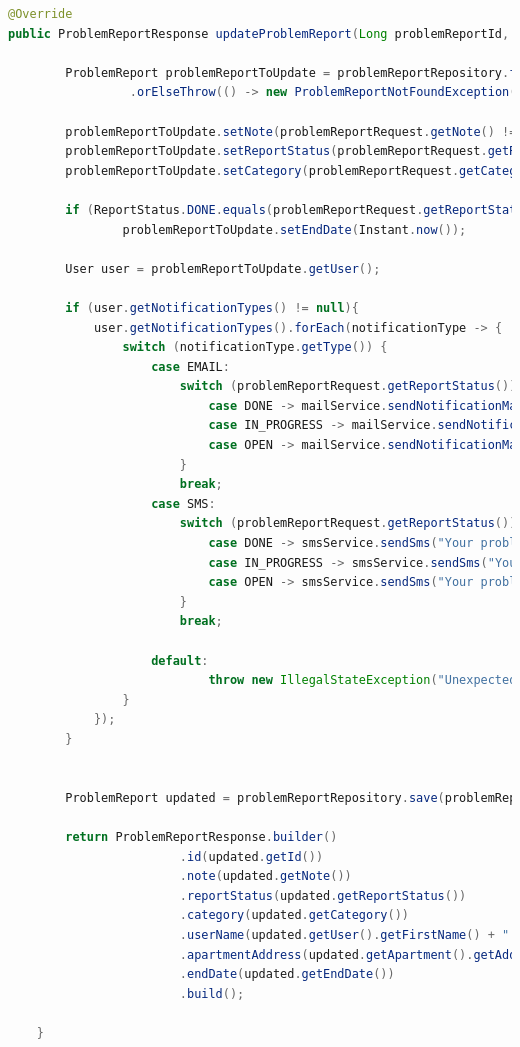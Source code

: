\begin{lstlisting}[language=Java, style=JavaStyle, caption=Aktualizacja zgłoszenia problemu.]
@Override
public ProblemReportResponse updateProblemReport(Long problemReportId, ProblemReportRequest problemReportRequest) throws ProblemReportNotFoundException {

		ProblemReport problemReportToUpdate = problemReportRepository.findById(problemReportId)
				 .orElseThrow(() -> new ProblemReportNotFoundException("Problem report not found with id: " + problemReportId));

		problemReportToUpdate.setNote(problemReportRequest.getNote() != null ? problemReportRequest.getNote() : problemReportToUpdate.getNote());
		problemReportToUpdate.setReportStatus(problemReportRequest.getReportStatus() != null ? problemReportRequest.getReportStatus() : problemReportToUpdate.getReportStatus());
		problemReportToUpdate.setCategory(problemReportRequest.getCategory() != null ? problemReportRequest.getCategory() : problemReportToUpdate.getCategory());

		if (ReportStatus.DONE.equals(problemReportRequest.getReportStatus()))
				problemReportToUpdate.setEndDate(Instant.now());

		User user = problemReportToUpdate.getUser();

		if (user.getNotificationTypes() != null){
			user.getNotificationTypes().forEach(notificationType -> {
				switch (notificationType.getType()) {
					case EMAIL:
						switch (problemReportRequest.getReportStatus()) {
							case DONE -> mailService.sendNotificationMail("Problem report done", "Your problem report has been done", user.getEmail());
							case IN_PROGRESS -> mailService.sendNotificationMail("Problem report in progress", "Your problem report is in progress", user.getEmail());
							case OPEN -> mailService.sendNotificationMail("Problem report open", "Your problem report is open", user.getEmail());
						}
						break;
					case SMS:
						switch (problemReportRequest.getReportStatus()) {
							case DONE -> smsService.sendSms("Your problem report has been done", user.getPhoneNumber());
							case IN_PROGRESS -> smsService.sendSms("Your problem report is in progress", user.getPhoneNumber());
							case OPEN -> smsService.sendSms("Your problem report is open", user.getPhoneNumber());
						}
						break;

					default:
							throw new IllegalStateException("Unexpected value: " + notificationType.getType());
				}
			});
		}


		ProblemReport updated = problemReportRepository.save(problemReportToUpdate);

		return ProblemReportResponse.builder()
						.id(updated.getId())
						.note(updated.getNote())
						.reportStatus(updated.getReportStatus())
						.category(updated.getCategory())
						.userName(updated.getUser().getFirstName() + " " + updated.getUser().getLastName())
						.apartmentAddress(updated.getApartment().getAddress())
						.endDate(updated.getEndDate())
						.build();

    }
\end{lstlisting}

